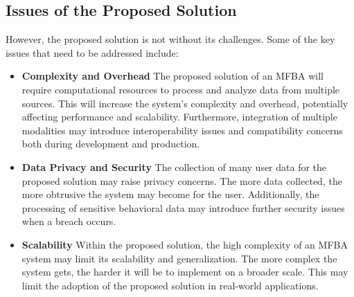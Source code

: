 \subsection{Issues of the Proposed Solution}

However, the proposed solution is not without its challenges. Some of the key issues that need to be addressed include:

\begin{itemize}
    \item \textbf{Complexity and Overhead}
    The proposed solution of an MFBA will require computational resources to process and analyze data from multiple sources. This will increase the system's complexity and overhead, potentially affecting performance and scalability. Furthermore, integration of multiple modalities may introduce interoperability issues and compatibility concerns both during development and production.

    \item \textbf{Data Privacy and Security}
    The collection of many user data for the proposed solution may raise privacy concerns. The more data collected, the more obtrusive the system may become for the user. Additionally, the processing of sensitive behavioral data may introduce further security issues when a breach occurs.
    
    \item \textbf{Scalability}
    Within the proposed solution, the high complexity of an MFBA system may limit its scalability and generalization. The more complex the system gets, the harder it will be to implement on a broader scale. This may limit the adoption of the proposed solution in real-world applications.

\end{itemize}
